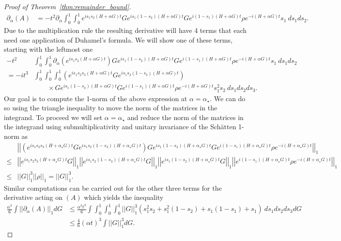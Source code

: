 \documentclass{article}
\newcommand{\norm}[1]{\left|\left| #1 \right|\right|}
\begin{document}
\begin{proof}[Proof of Theorem~\ref{thm:remainder_bound}]
\begin{align}
\partial_{\alpha} (A) &= -t^2 \partial_{\alpha} \int_0^1 \int_0^1 e^{i s_1 s_2 (H+\alpha G)t} G e^{i s_1 (1-s_2) (H+\alpha G)t} G e^{i(1-s_1) (H+\alpha G)t} \rho e^{-i(H+\alpha G) t}   s_1 ~ds_1 ds_2.
\end{align}
Due to the multiplication rule the resulting derivative will have 4 terms that each need one application of Duhamel's formula. We will show one of these terms, starting with the leftmost one
\begin{align}
    -t^2  &\int_0^1 \int_0^1 \partial_{\alpha} \left( e^{i s_1 s_2 (H+\alpha G)t} \right) G e^{i s_1 (1-s_2) (H+\alpha G)t} G e^{i(1-s_1) (H+\alpha G)t} \rho e^{-i(H+\alpha G) t}   s_1 ~ds_1 ds_2 \\
    = - i t^3  &\int_0^1 \int_0^1 \int_0^1 \left( e^{i s_1 s_2 s_3 (H+\alpha G)t} G e^{i s_1 s_2 (1 - s_3) (H+\alpha G)t} \right)\nonumber\\
    &\qquad\times G e^{i s_1 (1-s_2) (H+\alpha G)t} G e^{i(1-s_1) (H+\alpha G)t} \rho e^{-i(H+\alpha G) t}   s_1^2 s_2 ~ds_1 ds_2 ds_3.
\end{align}
Our goal is to compute the 1-norm of the above expression at $\alpha = \alpha_{\star}$. We can do so using the triangle inequality to move the norm of the matrices in the integrand. To proceed we will set $\alpha = \alpha_{\star}$ and reduce the norm of the matrices in the integrand using submultiplicativity and unitary invariance of the Sch\"{a}tten 1-norm as 
\begin{align}
    &\norm{\left( e^{i s_1 s_2 s_3 (H+\alpha_{\star} G)t} G e^{i s_1 s_2 (1 - s_3) (H+\alpha_{\star} G)t} \right) G e^{i s_1 (1-s_2) (H+\alpha_{\star} G)t} G e^{i(1-s_1) (H+\alpha_{\star} G)t} \rho e^{-i(H+\alpha_{\star} G) t}}_1 \\
    \le &\norm{e^{i s_1 s_2 s_3 (H+\alpha_{\star} G)t} G}_1 \norm{e^{i s_1 s_2 (1 - s_3) (H+\alpha_{\star} G)t} G}_1 \norm{e^{i s_1 (1-s_2) (H+\alpha_{\star} G)t} G}_1 \norm{e^{i(1-s_1) (H+\alpha_{\star} G)t} \rho e^{-i(H+\alpha_{\star} G) t}}_1 \\
    \le &\norm{G}_1^3 \norm{\rho}_1 = \norm{G}_1^3 .
\end{align}
Similar computations can be carried out for the other three terms for the derivative acting on $(A)$ which yields the inequality
\begin{align}
    \frac{\alpha^3}{6} \int \norm{\partial_{\alpha} (A)}_1 dG &\le \frac{\alpha^3 t^3}{6} \int \int_0^1 \int_0^1 \int_0^1 \norm{G}_1^3 (s_1^2 s_2 + s_1^2 (1 - s_2) + s_1(1-s_1) + s_1) ~ds_1 ds_2 ds_3 dG \\
    &\le \frac{4}{6} (\alpha t)^3 \int \norm{G}_1^3 dG . \label{eq:remainder_bound_on_A}
\end{align}


\end{proof}
\end{document}
